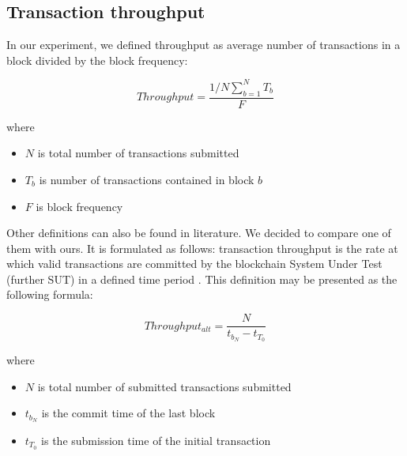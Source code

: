 \subsection{Transaction throughput} \label{throughput}
In our experiment, we defined throughput as average number of transactions in a block divided by the block frequency:

$$Throughput = \frac{1/N \sum_{b=1}^{N} T_b}{F}$$

where
\begin{itemize}
    \item $N$ is total number of transactions submitted
    \item $T_b$ is number of transactions contained in block $b$
    \item $F$ is block frequency
\end{itemize}

Other definitions can also be found in literature. We decided to compare one of them with ours. It is formulated as follows: transaction throughput is the rate at which valid transactions are committed by the blockchain System Under Test (further SUT) in a defined time period \cite{hyperledger_paper}. This definition may be presented as the following formula:

$$Throughput_{alt} = \frac{N}{t_{b_N} - t_{T_0}}$$

where
\begin{itemize}
    \item $N$ is total number of submitted transactions submitted
    \item $t_{b_N}$ is the commit time of the last block
    \item $t_{T_0}$ is the submission time of the initial transaction
\end{itemize}

